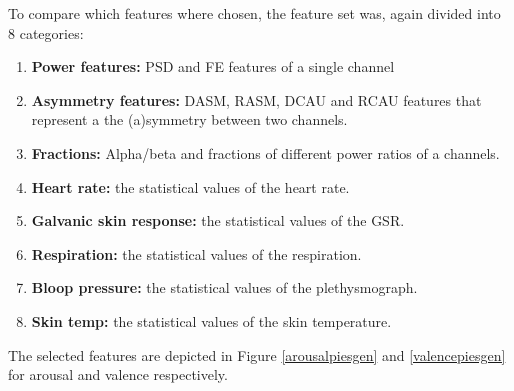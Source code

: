 To compare which features where chosen, the feature set was, again divided into 8 categories:
\begin{enumerate}
\item \textbf{Power features:} PSD and FE features of a single channel
\item \textbf{Asymmetry features:} DASM, RASM, DCAU and RCAU features that represent a the (a)symmetry between two channels.
\item \textbf{Fractions:} Alpha/beta and fractions of different power ratios of a channels.

\item \textbf{Heart rate:} the statistical values of the heart rate.
\item \textbf{Galvanic skin response:} the statistical values of the GSR.
\item \textbf{Respiration:} the statistical values of the respiration.
\item \textbf{Bloop pressure:} the statistical values of the plethysmograph.
\item \textbf{Skin temp:} the statistical values of the skin temperature.
\end{enumerate} 

The selected features are depicted in Figure \ref{arousalpiesgen} and \ref{valencepiesgen} for arousal and valence respectively.

